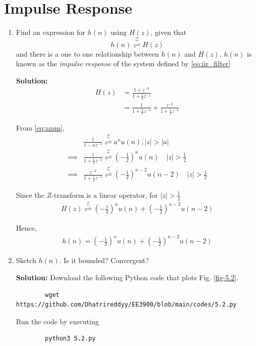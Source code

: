 \documentclass[journal,12pt,twocolumn]{IEEEtran}
\newcommand{\solution}{\noindent \textbf{Solution: }}
\providecommand{\brak}[1]{\ensuremath{\left(#1\right)}}
\providecommand{\abs}[1]{\left\vert#1\right\vert}
\providecommand{\ztrans}{\overset{\mathcal{Z}}{ \rightleftharpoons}}
\numberwithin{equation}{section}
\renewcommand\thesection{\arabic{section}}
\begin{document}
	\section{Impulse Response}
	\begin{enumerate}[label=\thesection.\arabic*]
	\item \label{prob:5.1}
	Find an expression for $h(n)$ using $H(z)$, given that 
	\begin{equation}
		\label{eq:5.1}
		h(n) \ztrans H(z)
	\end{equation}
	and there is a one to one relationship between $h(n)$ and $H(z)$. $h(n)$ is known as the {\em impulse response} of the system defined by \eqref{eq:iir_filter}
	
	\solution
	\begin{align}
		H(z) &= \frac{1 + z^{-2}}{1 + \frac12 z^{-1}} \\
		&= \frac{1}{1 + \frac12 z^{-1}} + \frac{z^{-2}}{1 + \frac12 z^{-1}}
	\end{align}
	
	From \eqref{eq:anun},
	\begin{align}
		&\frac{1}{1-az^{-1}} \ztrans a^nu(n), \abs{z} > \abs{a} \\
		\implies &\frac{1}{1 + \frac12 z^{-1}} \ztrans \brak{-\frac12}^n u(n) \quad \abs{z} > \frac12 \\
		\implies &\frac{z^{-2}}{1 + \frac12 z^{-1}} \ztrans \brak{-\frac12}^{n-2} u(n-2) \quad \abs{z} > \frac12
	\end{align}
	
	Since the $Z$-transform is a linear operator, for $\abs{z} > \frac12$
	\begin{align}
		H(z) \ztrans \brak{-\frac12}^n u(n) + \brak{-\frac12}^{n-2} u(n-2)
	\end{align}
	
	Hence, 
	\begin{align}
		h(n) = \brak{-\frac12}^n u(n) + \brak{-\frac12}^{n-2} u(n-2)
	\end{align}
	
	\item Sketch $h(n)$. Is it bounded? Convergent? 
	
	\solution Download the following Python code that plots Fig. \ref{fig-5.2}.
	\begin{lstlisting}
		wget https://github.com/Dhatrireddyy/EE3900/blob/main/codes/5.2.py
	\end{lstlisting}
	
	Run the code by executing
	\begin{lstlisting}
		python3 5.2.py
	\end{lstlisting}


\end{enumerate}
\end{document}
